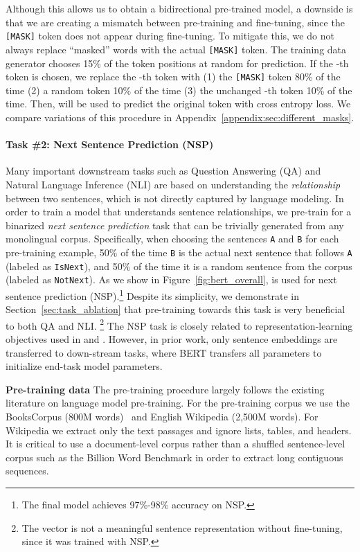 \documentclass[11pt,a4paper]{article}
\begin{document}
Although this allows us to obtain a bidirectional pre-trained model, a downside is that we are creating a mismatch between pre-training and fine-tuning, since the {\tt [MASK]} token does not appear during fine-tuning. To mitigate this, we do not always replace ``masked'' words with the actual {\tt [MASK]} token. The training data generator chooses 15\% of the token positions at random for prediction. If the -th token is chosen, we replace the -th token with (1) the {\tt [MASK]} token 80\% of the time (2) a random token 10\% of the time (3) the unchanged -th token 10\% of the time. Then,  will be used to predict the original token with cross entropy loss.
We compare variations of this procedure in Appendix~\ref{appendix:sec:different_masks}.
\vspace{.2cm}

\paragraph{Task \#2: Next Sentence Prediction (NSP)}
Many important downstream tasks such as Question Answering (QA) and Natural Language Inference (NLI) are based on understanding the {\it relationship} between two sentences, which is not directly captured by language modeling. In order to train a model that understands sentence relationships, we pre-train for a binarized {\it next sentence prediction} task that can be trivially generated from any monolingual corpus. Specifically, when choosing the sentences {\tt A} and {\tt B} for each pre-training example, 50\% of the time {\tt B} is the actual next sentence that follows {\tt A} (labeled
 as {\tt {\small IsNext}}), and 50\% of the time it is a random sentence from the corpus
 (labeled as {\tt {\small NotNext}}). 
As we show in Figure~\ref{fig:bert_overall},  is used for  next sentence prediction (NSP).\footnote{The final model achieves 97\%-98\% accuracy on NSP.} Despite its simplicity, we demonstrate in Section~\ref{sec:task_ablation} that pre-training towards this task is very beneficial to both QA and NLI.
\footnote{The vector  is not a meaningful sentence representation without fine-tuning, since it was trained with NSP.}
The NSP task is closely related to representation-learning objectives used in \citet{DBLP:journals/corr/JerniteBS17} and \citet{logeswaran2018an}. However, in prior work, only sentence embeddings are transferred to down-stream tasks, where BERT transfers all parameters to initialize end-task model parameters.



\vspace{.3cm}
\noindent\textbf{Pre-training data}
The pre-training procedure largely follows the existing literature on language model pre-training. For the pre-training corpus we use the BooksCorpus (800M words)~\cite{zhu:2015} and English Wikipedia (2,500M words). For Wikipedia we extract only the text passages and ignore lists, tables, and headers. It is critical to use a document-level corpus rather than a shuffled sentence-level corpus such as the Billion Word Benchmark \cite{chelba-etal:2013:_one} in order to extract long contiguous sequences.
\end{document}
